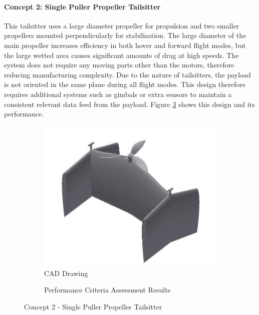 \paragraph{Concept 2: Single Puller Propeller Tailsitter}
This tailsitter uses a large diameter propeller for propulsion and two smaller propellers mounted perpendicularly for stabilisation. The large diameter of the main propeller increases efficiency in both hover and forward flight modes, but the large wetted area causes significant amounts of drag at high speeds. The system does not require any moving parts other than the motors, therefore reducing manufacturing complexity. Due to the nature of tailsitters, the payload is not oriented in the same plane during all flight modes. This design therefore requires additional systems such as gimbals or extra sensors to maintain a consistent relevant data feed from the payload. Figure \ref{fig:concept2} shows this design and its performance.



\begin{figure}[H]
\centering
\begin{subfigure}[t]{.5\textwidth}
  \centering
  \includegraphics[width=0.75\linewidth]{Concepts/CAD/5cad.jpg}
  \vspace{0.125cm}
  \caption{CAD Drawing}
  \label{fig:cad2}
\end{subfigure}%
\begin{subfigure}[t]{.5\textwidth}
  \centering
  \caption{Performance Criteria Assessment Results}
  \label{fig:radar2}
\end{subfigure}
\caption{Concept 2 - Single Puller Propeller Tailsitter}
\label{fig:concept2}
\end{figure}


